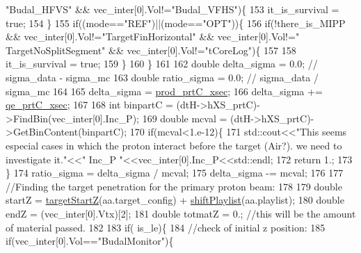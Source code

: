 \begin{DoxyCode}
{      "Budal\_HFVS"} && vec\_inter[0].Vol!=\textcolor{stringliteral}{"Budal\_VFHS"})\{
153       it\_is\_survival = \textcolor{keyword}{true};
154     \}    
155     \textcolor{keywordflow}{if}((mode==\textcolor{stringliteral}{"REF"})||(mode==\textcolor{stringliteral}{"OPT"}))\{
156       \textcolor{keywordflow}{if}(!there\_is\_MIPP && vec\_inter[0].Vol!=\textcolor{stringliteral}{"TargetFinHorizontal"} && vec\_inter[0].Vol!=\textcolor{stringliteral}{"
      TargetNoSplitSegment"} && vec\_inter[0].Vol!=\textcolor{stringliteral}{"tCoreLog"})\{
157 
158         it\_is\_survival = \textcolor{keyword}{true};
159       \}
160     \}
161     
162     \textcolor{keywordtype}{double} delta\_sigma = 0.0; \textcolor{comment}{// sigma\_data - sigma\_mc}
163     \textcolor{keywordtype}{double} ratio\_sigma = 0.0; \textcolor{comment}{// sigma\_data / sigma\_mc}
164 
165     delta\_sigma  = \hyperlink{class_neutrino_flux_reweight_1_1_target_attenuation_reweighter_aeffa7cad0d6106661a216901a5304ff8}{prod\_prtC\_xsec};
166     delta\_sigma  += \hyperlink{class_neutrino_flux_reweight_1_1_target_attenuation_reweighter_a69d6f0a9aae695e7abb4484bf3dce015}{qe\_prtC\_xsec}; 
167     
168     \textcolor{keywordtype}{int} binpartC = (dtH->hXS\_prtC)->FindBin(vec\_inter[0].Inc\_P);
169     \textcolor{keywordtype}{double} mcval = (dtH->hXS\_prtC)->GetBinContent(binpartC);
170     \textcolor{keywordflow}{if}(mcval<1.e-12)\{
171       std::cout<<\textcolor{stringliteral}{"This seems especial cases in which the proton interact before the target (Air?). we need
       to investigate it."}<<\textcolor{stringliteral}{" Inc\_P "}<<vec\_inter[0].Inc\_P<<std::endl;
172       \textcolor{keywordflow}{return} 1.;
173     \}
174     ratio\_sigma = delta\_sigma / mcval;
175     delta\_sigma -= mcval;
176     
177     \textcolor{comment}{//Finding the target penetration for the primary proton beam:}
178    
179     \textcolor{keywordtype}{double} startZ        = \hyperlink{class_neutrino_flux_reweight_1_1_target_attenuation_reweighter_abc3651ca760b302a9eb1590e2a2abcc7}{targetStartZ}(aa.target\_config) + 
      \hyperlink{class_neutrino_flux_reweight_1_1_target_attenuation_reweighter_abffb4bb0215666bf54f96a561f6fbcde}{shiftPlaylist}(aa.playlist);
180     \textcolor{keywordtype}{double} endZ = (vec\_inter[0].Vtx)[2];
181     \textcolor{keywordtype}{double} totmatZ = 0.;  \textcolor{comment}{//this will be the amount of material passed. }
182 
183     \textcolor{keywordflow}{if}( is\_le)\{
184       \textcolor{comment}{//check of initial z position:}
185       \textcolor{keywordflow}{if}(vec\_inter[0].Vol==\textcolor{stringliteral}{"BudalMonitor"})\{

\end{DoxyCode}
